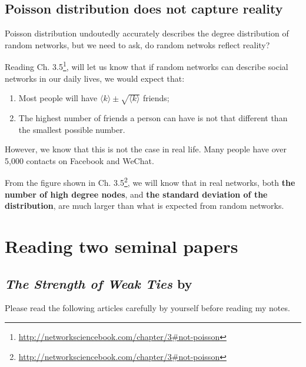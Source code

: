 \documentclass[
]{krantz}
\renewcommand{\href}[2]{#2\footnote{\url{#1}}}
\begin{document}
\hypertarget{poisson-distribution-does-not-capture-reality}{%
\subsection{Poisson distribution does not capture reality}\label{poisson-distribution-does-not-capture-reality}}

Poisson distribution undoutedly accurately describes the degree distribution of random networks, but we need to ask, do random netwoks reflect reality?

Reading \href{http://networksciencebook.com/chapter/3\#not-poisson}{Ch. 3.5}, will let us know that if random networks can describe social networks in our daily lives, we would expect that:

\begin{enumerate}
\def\labelenumi{\arabic{enumi}.}
\item
  Most people will have \(\langle k \rangle \pm \sqrt {\langle k \rangle}\) friends;
\item
  The highest number of friends a person can have is not that different than the smallest possible number.
\end{enumerate}

However, we know that this is not the case in real life. Many people have over 5,000 contacts on Facebook and WeChat.

From the figure shown in \href{http://networksciencebook.com/chapter/3\#not-poisson}{Ch. 3.5}, we will know that in real networks, both \textbf{the number of high degree nodes}, and \textbf{the standard deviation of the distribution}, are much larger than what is expected from random networks.

\hypertarget{reading-two-seminal-papers}{%
\section{Reading two seminal papers}\label{reading-two-seminal-papers}}

\hypertarget{the-strength-of-weak-ties-by-granovetter1973strength}{%
\subsection{\texorpdfstring{\emph{The Strength of Weak Ties} by \citet{granovetter1973strength}}{The Strength of Weak Ties by @granovetter1973strength}}\label{the-strength-of-weak-ties-by-granovetter1973strength}}

Please read the following articles carefully by yourself before reading my notes.
\end{document}

